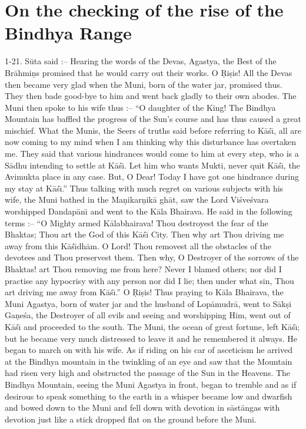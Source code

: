 \chapter{On the checking of the rise of the Bindhya Range}

1-21. S\=uta said :-- Hearing the words of the Devas, Agastya, the Best of the Br\=ahmi\d{n}s promised that he would carry out their works. O \d{R}i\d{s}is! All the Devas then became very glad when the Muni, born of the water jar, promised thus. They then bade good-bye to him and went back gladly to their own abodes. The Muni then spoke to his wife thus :-- ``O daughter of the King! The Bindhya Mountain has baffled the progress of the Sun's course and has thus caused a great mischief. What the Munis, the Seers of truths said before referring to K\=a\'s\={\i}, all are now coming to my mind when I am thinking why this disturbance has overtaken me. They said that various hindrances would come to him at every step, who is a S\=adhu intending to settle at K\=a\'s\={\i}. Let him who wants Mukti, never quit K\=a\'s\={\i}, the Avimukta place in any case. But, O Dear! Today I have got one hindrance during my stay at K\=a\'s\={\i}.'' Thus talking with much regret on various subjects with his wife, the Muni bathed in the Ma\d{n}ikar\d{n}ik\=a gh\=at, saw the Lord Vi\'sve\'svara worshipped Dandap\=an\={\i} and went to the K\=ala Bhairava. He said in the following terms :-- ``O Mighty armed K\=alabhairava! Thou destroyest the fear of the Bhaktas; Thou art the God of this K\=a\'s\={\i} City. Then why art Thou driving me away from this K\=a\'s\={\i}dh\=am. O Lord! Thou removest all the obstacles of the devotees and Thou preservest them. Then why, O Destroyer of the sorrows of the Bhaktas! art Thou removing me from here? Never I blamed others; nor did I practise any hypocrisy with any person nor did I lie; then under what sin, Thou art driving me away from K\=a\'s\={\i}.'' O \d{R}i\d{s}is! Thus praying to K\=ala Bhairava, the Muni Agastya, born of water jar and the husband of Lop\=amudr\=a, went to S\=ak\d{s}i Ga\d{n}e\'sa, the Destroyer of all evils and seeing and worshipping Him, went out of K\=a\'s\={\i} and proceeded to the south. The Muni, the ocean of great fortune, left K\=a\'s\={\i}; but he became very much distressed to leave it and he remembered it always. He began to march on with his wife. As if riding on his car of asceticism he arrived at the Bindhya mountain in the twinkling of an eye and saw that the Mountain had risen very high and obstructed the passage of the Sun in the Heavens. The Bindhya Mountain, seeing the Muni Agastya in front, began to tremble and as if desirous to speak something to the earth in a whisper became low and dwarfish and bowed down to the Muni and fell down with devotion in s\=ast\=angas with devotion just like a stick dropped flat on the ground before the Muni.

